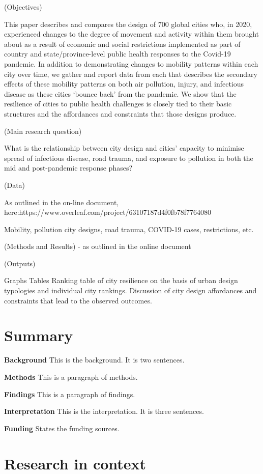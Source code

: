 \documentclass[preprint,12pt]{elsarticle}
\begin{document}
(Objectives)

This paper describes and compares the design of 700 global cities who, in 2020, experienced changes to the degree of movement and activity within them brought about as a result of economic and social restrictions implemented as part of country and state/province-level public health responses to the Covid-19 pandemic. In addition to demonstrating changes to mobility patterns within each city over time, we gather and report data from each that describes the secondary effects of these mobility patterns on both air pollution, injury, and infectious disease as these cities ‘bounce back’ from the pandemic. We show that the resilience of cities to public health challenges is closely tied to their basic structures and the affordances and constraints that those designs produce.

(Main research question)

What is the relationship between city design and cities’ capacity to minimise spread of infectious disease, road trauma, and exposure to pollution in both the mid and post-pandemic response phases?

(Data)

As outlined in the on-line document, here:https://www.overleaf.com/project/63107187d4f0fb78f7764080

Mobility, pollution city designs, road trauma, COVID-19 cases, restrictions, etc.

(Methods and Results) - as outlined in the online document

(Outputs)

    Graphs
    Tables
    Ranking table of city resilience on the basis of urban design typologies and individual city rankings.
    Discussion of city design affordances and constraints that lead to the observed outcomes.


\section*{Summary}
\textbf{Background} This is the background. It is two sentences.

\textbf{Methods} This is a paragraph of methods.


\textbf{Findings} This is a paragraph of findings.

\textbf{Interpretation} This is the interpretation. It is three sentences.

\textbf{Funding} States the funding sources.

\section*{Research in context}
\end{document}
